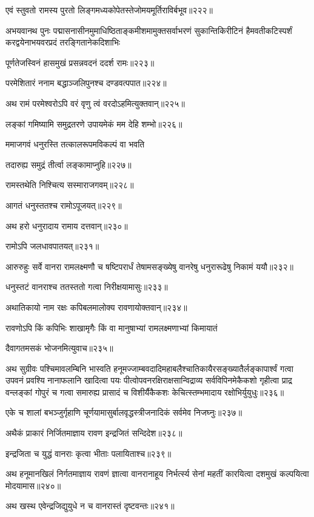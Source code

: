 \begin{flushleft}
एवं स्तुवतो रामस्य पुरतो लिङ्गमध्यकोपेतस्तेजोमयमूर्तिराविर्बभूव॥२२२॥

अभयवानथ पुनः पद्मासनासीनमुमाधिष्ठिताङ्कमीशमामुक्तसर्वाभरणं सुकान्तिकिरीटिनं हैमवतीकटिस्पर्शं करद्वयेनाभयवरप्रदं तरङ्गितानेकदिशाभिः

पूर्णतेजस्विनं हासमुखं प्रसन्नवदनं ददर्श रामः॥२२३॥

परमेशितारं ननाम बद्धाञ्जलिपुनश्च दण्डवत्पपात॥२२४॥

अथ रामं परमेश्वरोऽपि वरं वृणु त्वं वरदोऽहमित्युक्तवान्॥२२५॥


लङ्कां गमिष्यामि समुद्रतरणे उपायमेकं मम देहि शम्भो॥२२६॥


ममाजगवं धनुरस्ति तत्कालरूपमविकल्पं वा भवति

तदारुह्य समुद्रं तीर्त्वा लङ्कामाप्नुहि॥२२७॥

रामस्तथेति निश्चित्य सस्माराजगवम्॥२२८॥

आगतं धनुस्ततश्च रामोऽपूजयत्॥२२९॥

अथ हरो धनुरादाय रामाय दत्तवान्॥२३०॥

रामोऽपि जलधावपातयत्॥२३१॥

आरुरुहुः सर्वे वानरा रामलक्ष्मणौ च षष्टिपरार्धं तेषामसङ्ख्येषु वानरेषु धनुरारूढेषु निकामं ययौ॥२३२॥

धनुस्तटं वानराश्च ततस्ततो गत्वा निरीक्षयामासुः॥२३३॥

अथातिकायो नाम रक्षः कपिबलमालोक्य रावणायोक्तवान्॥२३४॥

रावणोऽपि किं कपिभिः शाखामृगैः किं वा मानुषाभ्यां रामलक्ष्मणाभ्यां किमायातं

दैवागतमसकं भोजनमित्युवाच॥२३५॥

अथ सुग्रीवः पश्चिमावलम्बिनि भास्वति हनूमज्जाम्बवदादिमहाबलैश्चातिकायैरसङ्ख्यातैर्लङ्कापार्श्वं गत्वा उपवनं प्रवश्यि नानाफलानि खादित्वा पयः पीत्वोपवनरक्षिराक्षसान्विद्राव्य सर्वविपिनमेकैकशो गृहीत्वा प्राद्र वन्लङ्कां गोपुरं च गत्वा समारुह्य प्रासादं च विशीर्यैकैकशः केचित्स्तम्भमादाय रक्षोभिर्युयुधुः॥२३६॥

एके च शालां बभञ्जुर्गृहाणि चूर्णयामासुर्बालवृद्धस्त्रीजनादिकं सर्वमेव निजघ्नुः॥२३७॥

अथैकं प्राकारं निर्जितमाज्ञाय रावण इन्द्रजितं सन्दिदेश॥२३८॥

इन्द्रजिता च युद्धं वानराः कृत्वा भीताः पलायिताश्च॥२३९॥

अथ हनूमानखिलं निर्गतमाज्ञाय रावणं ज्ञात्वा वानरानाहूय निर्भर्त्स्य सेनां महतीं कारयित्वा दशमुखं कल्पयित्वा मोदयामास॥२४०॥

अथ खस्थ एवेन्द्रजिद्युयुधे न च वानरास्तं दृष्टवन्तः॥२४१॥


\end{flushleft}
